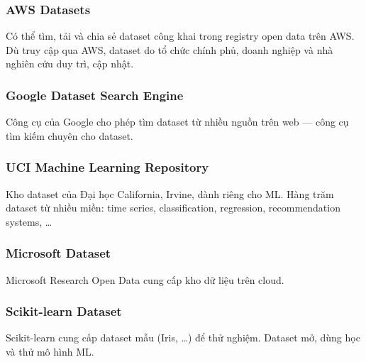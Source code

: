 \subsubsection{AWS Datasets}

\begin{ynghia}[title={AWS Datasets}]
Có thể tìm, tải và chia sẻ dataset công khai trong registry open data trên AWS.
Dù truy cập qua AWS, dataset do tổ chức chính phủ, doanh nghiệp và nhà nghiên cứu duy trì, cập nhật.
\end{ynghia}

\subsubsection{Google Dataset Search Engine}

\begin{ynghia}[title={Google Dataset Search}]
Công cụ của Google cho phép tìm dataset từ nhiều nguồn trên web --- công cụ tìm kiếm chuyên cho dataset.
\end{ynghia}

\subsubsection{UCI Machine Learning Repository}

\begin{ynghia}[title={UCI ML Repository}]
Kho dataset của Đại học California, Irvine, dành riêng cho ML.
Hàng trăm dataset từ nhiều miền: time series, classification, regression, recommendation systems, \ldots
\end{ynghia}

\subsubsection{Microsoft Dataset}

\begin{ynghia}[title={Microsoft Dataset}]
Microsoft Research Open Data cung cấp kho dữ liệu trên cloud.
\end{ynghia}

\subsubsection{Scikit-learn Dataset}

\begin{ynghia}[title={Scikit-learn Dataset}]
Scikit-learn cung cấp dataset mẫu (Iris, \ldots) để thử nghiệm.
Dataset mở, dùng học và thử mô hình ML.
\end{ynghia}

